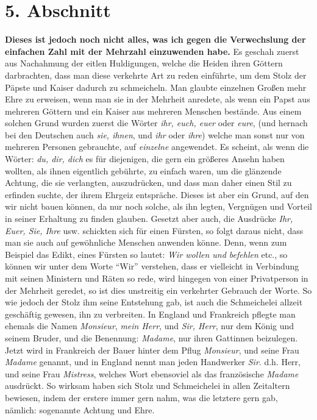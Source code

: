 \section{5. Abschnitt} \label{kap10_ab5}

\textbf{Dieses ist jedoch noch nicht alles, was ich gegen die Verwechslung der
einfachen Zahl mit der Mehrzahl einzuwenden habe.} Es geschah zuerst aus
Nachahmung der eitlen Huldigungen, welche die Heiden
ihren Göttern darbrachten,
dass man diese verkehrte Art zu reden einführte, um dem Stolz der
Päpste und
Kaiser dadurch zu schmeicheln.
Man glaubte einzelnen Großen mehr Ehre zu
erweisen, wenn man sie in der Mehrheit anredete, als wenn ein Papst aus mehreren
Göttern und ein Kaiser aus mehreren Menschen bestände. Aus einem solchen Grund
wurden zuerst die Wörter \textit{ihr, euch, euer} oder \textit{eure}, (und
hernach bei
den Deutschen auch \textit{sie, ihnen}, und \textit{ihr} oder \textit{ihre})
welche man sonst
nur von mehreren Personen gebrauchte, auf \textit{einzelne} angewendet. Es
scheint,
als wenn die Wörter: \textit{du, dir, dich} es für diejenigen, die gern ein
größeres
Ansehn haben wollten, als ihnen eigentlich gebührte, zu einfach waren, um die
glänzende Achtung, die sie verlangten, auszudrücken, und dass man daher einen
Stil zu erfinden suchte, der ihrem Ehrgeiz entspräche. Dieses ist aber ein
Grund, auf den wir nicht bauen können, da nur noch solche, als ihn legten,
Vergnügen und Vorteil in seiner Erhaltung zu finden glauben. Gesetzt aber auch,
die Ausdrücke \textit{Ihr, Euer, Sie, Ihre} usw. schickten sich für einen
Fürsten,
so folgt daraus nicht, dass man sie auch auf gewöhnliche Menschen anwenden
könne.
Denn, wenn zum Beispiel das Edikt,
eines Fürsten so lautet: \textit{Wir wollen und
befehlen}
etc., so können wir unter dem Worte "`Wir"' verstehen, dass er vielleicht in
Verbindung mit seinen Ministern und Räten so rede, wird hingegen von einer
Privatperson in der Mehrheit geredet, so ist dies unstreitig ein verkehrter
Gebrauch der Worte. So wie jedoch der Stolz ihm seine Entstehung gab, ist auch
die Schmeichelei allzeit geschäftig gewesen, ihn zu verbreiten. In England und
Frankreich pflegte man ehemals die Namen \textit{Monsieur}, \textit{mein
Herr}, und
\textit{Sir, Herr}, nur dem König und seinem Bruder, und die Benennung:
\textit{Madame},
nur ihren Gattinnen beizulegen. Jetzt wird in Frankreich der
Bauer hinter dem
Pflug \textit{Monsieur}, und seine Frau \textit{Madame} genannt, und in England
nennt man
jeden Handwerker \textit{Sir}. d.h. Herr, und
seine
Frau \textit{Mistress}, welches Wort
ebensoviel als das französische \textit{Madame} ausdrückt. So wirksam haben sich
Stolz und
Schmeichelei in allen Zeitaltern bewiesen, indem der erstere immer gern nahm,
was die letztere gern gab, nämlich: sogenannte Achtung und Ehre.

